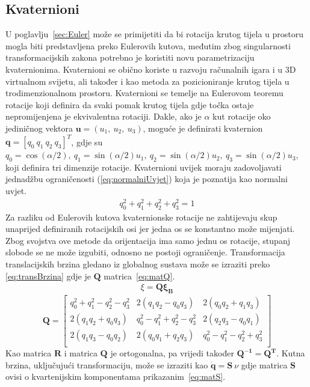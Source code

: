 \documentclass[times, utf8, diplomski]{fer}
\begin{document}
\subsection{Kvaternioni}\label{sec:Kvaternioni}
U poglavlju~\ref{sec:Euler} može se primijetiti da bi rotacija krutog tijela u prostoru mogla biti predstavljena preko Eulerovih kutova, međutim zbog singularnosti transformacijskih zakona potrebno je koristiti novu parametrizaciju kvaternionima. Kvaternioni se obično koriste u razvoju računalnih igara i u 3D virtualnom svijetu, ali također i kao metoda za pozicioniranje krutog tijela u trodimenzionalnom prostoru. Kvaternioni se temelje na Eulerovom teoremu rotacije koji definira da svaki pomak krutog tijela gdje točka ostaje nepromijenjena je ekvivalentna rotaciji. Dakle, ako je $\alpha$ kut rotacije oko jediničnog vektora $\mathbf{u} = (u_1, ~u_2, ~u_3)$, moguće je definirati kvaternion $\mathbf{q} = [q_0 ~q_1 ~q_2 ~q_3]^T$, gdje su $q_0 = \cos(\alpha/2), ~q_1 = \sin(\alpha/2)u_1, ~q_2 = \sin(\alpha/2)u_2, ~q_3 = \sin(\alpha/2)u_3$, koji definira tri dimenzije rotacije. Kvaternioni uvijek moraju zadovoljavati jednadžbu ograničenosti (\ref{eq:normalniUvjet}) koja je poznatija kao normalni uvjet. 
\begin{align}
q^2_0+q^2_1+q^2_2+q^2_3=1 \label{eq:normalniUvjet}
\end{align}
Za razliku od Eulerovih kutova kvaternionske rotacije ne zahtijevaju skup unaprijed definiranih rotacijskih osi jer jedna os se konstantno može mijenjati. Zbog svojstva ove metode da orijentacija ima samo jednu os rotacije, stupanj slobode se ne može izgubiti, odnosno ne postoji ograničenje. Transformacija translacijskih brzina gledano iz globalnog sustava može se izraziti preko \ref{eq:transBrzina} gdje je $\mathbf{Q}$ matrica~\ref{eq:matQ}.
\begin{align}
\xi=\mathbf{Q\xi_B} \label{eq:transBrzina}
\end{align}
\begin{equation}
	\mathbf{Q} =
	\begin{bmatrix}
	q^2_0+q^2_1-q^2_2-q^2_3 & 2(q_1q_2-q_0q_3) & 2(q_0q_2+q_1q_3) \\
	2(q_1q_2+q_0q_3) & q^2_0-q^2_1+q^2_2-q^2_3 & 2(q_2q_3-q_0q_1) \\
	2(q_1q_3-q_0q_2) & 2(q_0q_1+q_2q_3) & q^2_0-q^2_1-q^2_2+q^2_3 \\
	\end{bmatrix}
	\label{eq:matQ}
\end{equation}
Kao matrica $\mathbf{R}$ i matrica $\mathbf{Q}$ je ortogonalna, pa vrijedi također $\mathbf{Q^{-1} = Q^{T}}$. Kutna brzina, uključujući transformaciju, može se izraziti kao $\mathbf{\dot{q}}=\mathbf{S}~\nu$ gdje matrica $\mathbf{S}$ ovisi o kvartenijskim komponentama prikazanim~\ref{eq:matS}.
\end{document}
